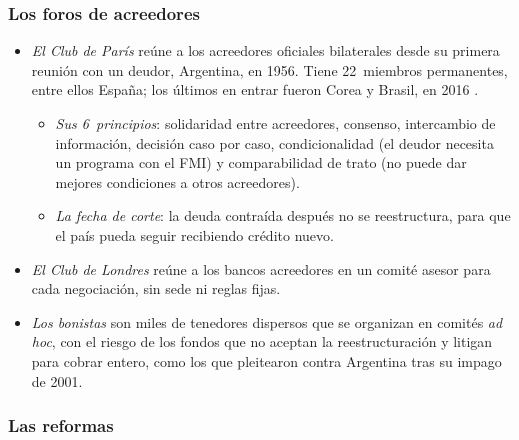 \documentclass[11pt]{article}
\begin{document}
\subsubsection{Los foros de acreedores}\label{sec:foros}

\begin{itemize}
\item \emph{El Club de París} reúne a los acreedores oficiales bilaterales desde su primera reunión con un deudor, Argentina, en 1956. Tiene 22~miembros permanentes, entre ellos España; los últimos en entrar fueron Corea y Brasil, en 2016\nocite{ClubParis2026Miembros,Francia2026ClubParis} .
  \begin{itemize}
  \item \emph{Sus 6~principios}: solidaridad entre acreedores, consenso, intercambio de información, decisión caso por caso, condicionalidad (el deudor necesita un programa con el FMI) y comparabilidad de trato (no puede dar mejores condiciones a otros acreedores).
  \item \emph{La fecha de corte}: la deuda contraída después no se reestructura, para que el país pueda seguir recibiendo crédito nuevo.
  \end{itemize}
\item \emph{El Club de Londres} reúne a los bancos acreedores en un comité asesor para cada negociación, sin sede ni reglas fijas.
\item \emph{Los bonistas} son miles de tenedores dispersos que se organizan en comités \emph{ad hoc}, con el riesgo de los fondos que no aceptan la reestructuración y litigan para cobrar entero, como los que pleitearon contra Argentina tras su impago de 2001.
\end{itemize}

\subsubsection{Las reformas}\label{sec:reformas-deuda}
\end{document}
